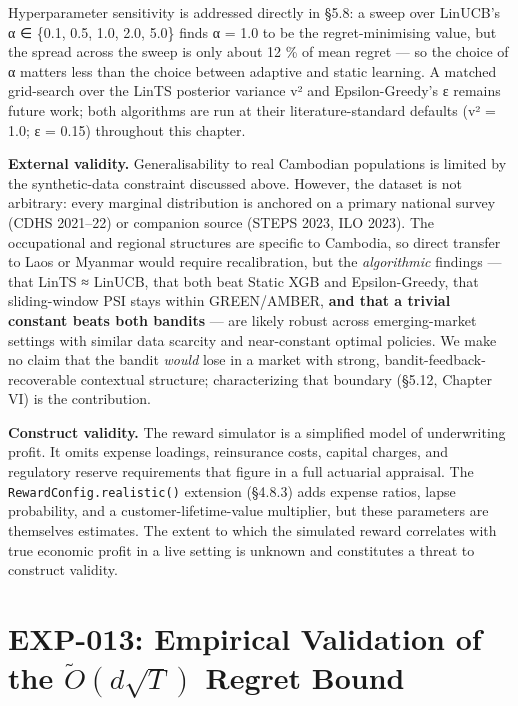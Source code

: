 Hyperparameter sensitivity is addressed directly in §5.8: a sweep over LinUCB's α ∈ \{0.1, 0.5, 1.0, 2.0, 5.0\} finds α = 1.0 to be the regret-minimising value, but the spread across the sweep is only about 12 \% of mean regret --- so the choice of α matters less than the choice between adaptive and static learning. A matched grid-search over the LinTS posterior variance v² and Epsilon-Greedy's ε remains future work; both algorithms are run at their literature-standard defaults (v² = 1.0; ε = 0.15) throughout this chapter.

\textbf{External validity.} Generalisability to real Cambodian populations is limited by the synthetic-data constraint discussed above. However, the dataset is not arbitrary: every marginal distribution is anchored on a primary national survey (CDHS 2021--22) or companion source (STEPS 2023, ILO 2023). The occupational and regional structures are specific to Cambodia, so direct transfer to Laos or Myanmar would require recalibration, but the \emph{algorithmic} findings --- that LinTS ≈ LinUCB, that both beat Static XGB and Epsilon-Greedy, that sliding-window PSI stays within GREEN/AMBER, \textbf{and that a trivial constant beats both bandits} --- are likely robust across emerging-market settings with similar data scarcity and near-constant optimal policies. We make no claim that the bandit \emph{would} lose in a market with strong, bandit-feedback-recoverable contextual structure; characterizing that boundary (§5.12, Chapter VI) is the contribution.

\textbf{Construct validity.} The reward simulator is a simplified model of underwriting profit. It omits expense loadings, reinsurance costs, capital charges, and regulatory reserve requirements that figure in a full actuarial appraisal. The \texttt{RewardConfig.realistic()} extension (§4.8.3) adds expense ratios, lapse probability, and a customer-lifetime-value multiplier, but these parameters are themselves estimates. The extent to which the simulated reward correlates with true economic profit in a live setting is unknown and constitutes a threat to construct validity.

\section{\texorpdfstring{EXP-013: Empirical Validation of the \(\tilde O(d\sqrt{T})\) Regret Bound}{EXP-013: Empirical Validation of the \textbackslash tilde O(d\textbackslash sqrt\{T\}) Regret Bound}}\label{exp-013-empirical-validation-of-the-tilde-odsqrtt-regret-bound}

